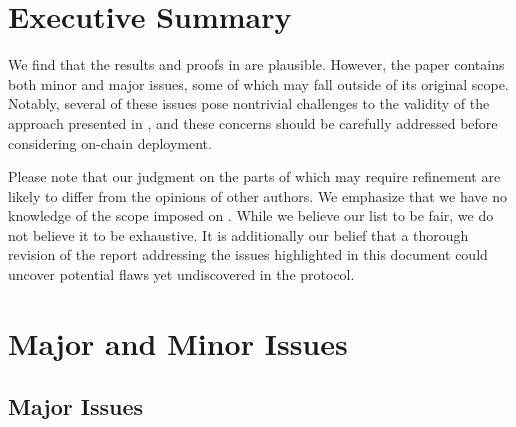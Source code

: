 \documentclass{article}
\theoremstyle{definition}
\newcommand{\6}{\mathbf}
\newcommand{\7}{\mathcal}
\begin{document}
\section{Executive Summary}


We find that the results and proofs in \cite{BassaSoundnessIPDL} are plausible. However, the paper contains both minor and major issues, some of which may fall outside of its original scope. Notably, several of these issues pose nontrivial challenges to the validity of the approach presented in \cite{Eagen22}, and these concerns should be carefully addressed before considering on-chain deployment.
\smallskip

Please note that our judgment on the parts of \cite{BassaSoundnessIPDL} which may require refinement are likely to differ from the opinions of other authors. 
We emphasize that we have no knowledge of the scope imposed on \cite{BassaSoundnessIPDL}.
While we believe our list to be fair,  we do not believe it to be exhaustive.  
It is additionally our belief that a thorough revision of the report addressing the issues highlighted in this document could uncover potential flaws yet undiscovered in the protocol.


\section{Major and Minor Issues}

\subsection{Major Issues}\label{sec:maj}
\end{document}
